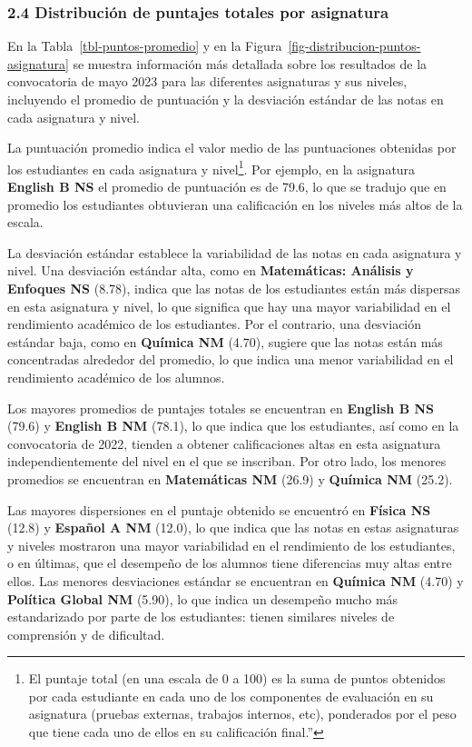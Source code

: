 \documentclass[
  letterpaper,
  DIV=11,
  numbers=noendperiod]{scrartcl}
\begin{document}
\hypertarget{distribuciuxf3n-de-puntajes-totales-por-asignatura}{%
\subsubsection{2.4 Distribución de puntajes totales por
asignatura}\label{distribuciuxf3n-de-puntajes-totales-por-asignatura}}

En la Tabla~\ref{tbl-puntos-promedio} y en la
Figura~\ref{fig-distribucion-puntos-asignatura} se muestra información
más detallada sobre los resultados de la convocatoria de mayo 2023 para
las diferentes asignaturas y sus niveles, incluyendo el promedio de
puntuación y la desviación estándar de las notas en cada asignatura y
nivel.

La puntuación promedio indica el valor medio de las puntuaciones
obtenidas por los estudiantes en cada asignatura y nivel\footnote{El
  puntaje total (en una escala de 0 a 100) es la suma de puntos
  obtenidos por cada estudiante en cada uno de los componentes de
  evaluación en su asignatura (pruebas externas, trabajos internos,
  etc), ponderados por el peso que tiene cada uno de ellos en su
  calificación final.''}. Por ejemplo, en la asignatura \textbf{English
B NS} el promedio de puntuación es de 79.6, lo que se tradujo que en
promedio los estudiantes obtuvieran una calificación en los niveles más
altos de la escala.

La desviación estándar establece la variabilidad de las notas en cada
asignatura y nivel. Una desviación estándar alta, como en
\textbf{Matemáticas: Análisis y Enfoques NS} (8.78), indica que las
notas de los estudiantes están más dispersas en esta asignatura y nivel,
lo que significa que hay una mayor variabilidad en el rendimiento
académico de los estudiantes. Por el contrario, una desviación estándar
baja, como en \textbf{Química NM} (4.70), sugiere que las notas están
más concentradas alrededor del promedio, lo que indica una menor
variabilidad en el rendimiento académico de los alumnos.

Los mayores promedios de puntajes totales se encuentran en
\textbf{English B NS} (79.6) y \textbf{English B NM} (78.1), lo que
indica que los estudiantes, así como en la convocatoria de 2022, tienden
a obtener calificaciones altas en esta asignatura independientemente del
nivel en el que se inscriban. Por otro lado, los menores promedios se
encuentran en \textbf{Matemáticas NM} (26.9) y \textbf{Química NM}
(25.2).

Las mayores dispersiones en el puntaje obtenido se encuentró en
\textbf{Física NS} (12.8) y \textbf{Español A NM} (12.0), lo que indica
que las notas en estas asignaturas y niveles mostraron una mayor
variabilidad en el rendimiento de los estudiantes, o en últimas, que el
desempeño de los alumnos tiene diferencias muy altas entre ellos. Las
menores desviaciones estándar se encuentran en \textbf{Química NM}
(4.70) y \textbf{Política Global NM} (5.90), lo que indica un desempeño
mucho más estandarizado por parte de los estudiantes: tienen similares
niveles de comprensión y de dificultad.
\end{document}
